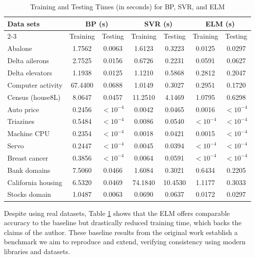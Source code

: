 \documentclass[12pt]{article}
\begin{document}
\begin{table}[h]
\centering
\caption{Training and Testing Times (in seconds) for BP, SVR, and ELM}
\label{tab:training_times}
\begin{tabular}{@{}lcccccc@{}}
\hline
\textbf{Data sets} & \multicolumn{2}{c}{\textbf{BP (s)}} & \multicolumn{2}{c}{\textbf{SVR (s)}} & \multicolumn{2}{c}{\textbf{ELM (s)}} \\
\cline{2-3} \cline{4-5} \cline{6-7}
 & Training & Testing & Training & Testing & Training & Testing \\
\hline
Abalone & 1.7562 & 0.0063 & 1.6123 & 0.3223 & 0.0125 & 0.0297 \\
Delta ailerons & 2.7525 & 0.0156 & 0.6726 & 0.2231 & 0.0591 & 0.0627 \\
Delta elevators & 1.1938 & 0.0125 & 1.1210 & 0.5868 & 0.2812 & 0.2047 \\
Computer activity & 67.4400 & 0.0688 & 1.0149 & 0.3027 & 0.2951 & 0.1720 \\
Census (house8L) & 8.0647 & 0.0457 & 11.2510 & 4.1469 & 1.0795 & 0.6298 \\
Auto price & 0.2456 & $<10^{-4}$ & 0.0042 & 0.0465 & 0.0016 & $<10^{-4}$ \\
Triazines & 0.5484 & $<10^{-4}$ & 0.0086 & 0.0540 & $<10^{-4}$ & $<10^{-4}$ \\
Machine CPU & 0.2354 & $<10^{-4}$ & 0.0018 & 0.0421 & 0.0015 & $<10^{-4}$ \\
Servo & 0.2447 & $<10^{-4}$ & 0.0045 & 0.0394 & $<10^{-4}$ & $<10^{-4}$ \\
Breast cancer & 0.3856 & $<10^{-4}$ & 0.0064 & 0.0591 & $<10^{-4}$ & $<10^{-4}$ \\
Bank domains & 7.5060 & 0.0466 & 1.6084 & 0.3021 & 0.6434 & 0.2205 \\
California housing & 6.5320 & 0.0469 & 74.1840 & 10.4530 & 1.1177 & 0.3033 \\
Stocks domain & 1.0487 & 0.0063 & 0.0690 & 0.0637 & 0.0172 & 0.0297 \\
\hline
\end{tabular}
\end{table}


Despite using real datasets, Table \ref{tab:training_times} shows that the ELM offers comparable accuracy to the baseline but drastically reduced training time, which backs the claims of the author. These baseline results from the original work establish a benchmark we aim to reproduce and extend, verifying consistency using modern libraries and datasets.
\end{document}
